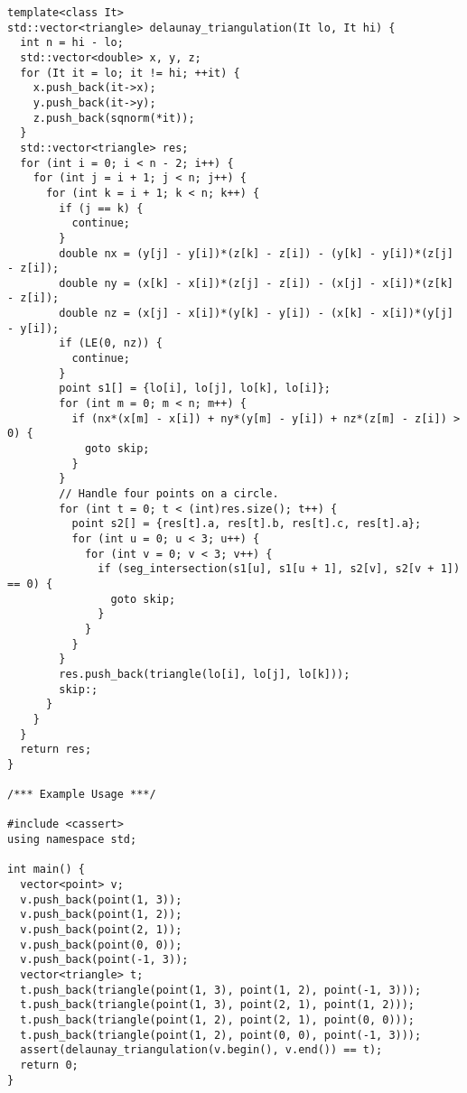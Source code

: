 \begin{lstlisting}
template<class It>
std::vector<triangle> delaunay_triangulation(It lo, It hi) {
  int n = hi - lo;
  std::vector<double> x, y, z;
  for (It it = lo; it != hi; ++it) {
    x.push_back(it->x);
    y.push_back(it->y);
    z.push_back(sqnorm(*it));
  }
  std::vector<triangle> res;
  for (int i = 0; i < n - 2; i++) {
    for (int j = i + 1; j < n; j++) {
      for (int k = i + 1; k < n; k++) {
        if (j == k) {
          continue;
        }
        double nx = (y[j] - y[i])*(z[k] - z[i]) - (y[k] - y[i])*(z[j] - z[i]);
        double ny = (x[k] - x[i])*(z[j] - z[i]) - (x[j] - x[i])*(z[k] - z[i]);
        double nz = (x[j] - x[i])*(y[k] - y[i]) - (x[k] - x[i])*(y[j] - y[i]);
        if (LE(0, nz)) {
          continue;
        }
        point s1[] = {lo[i], lo[j], lo[k], lo[i]};
        for (int m = 0; m < n; m++) {
          if (nx*(x[m] - x[i]) + ny*(y[m] - y[i]) + nz*(z[m] - z[i]) > 0) {
            goto skip;
          }
        }
        // Handle four points on a circle.
        for (int t = 0; t < (int)res.size(); t++) {
          point s2[] = {res[t].a, res[t].b, res[t].c, res[t].a};
          for (int u = 0; u < 3; u++) {
            for (int v = 0; v < 3; v++) {
              if (seg_intersection(s1[u], s1[u + 1], s2[v], s2[v + 1]) == 0) {
                goto skip;
              }
            }
          }
        }
        res.push_back(triangle(lo[i], lo[j], lo[k]));
        skip:;
      }
    }
  }
  return res;
}

/*** Example Usage ***/

#include <cassert>
using namespace std;

int main() {
  vector<point> v;
  v.push_back(point(1, 3));
  v.push_back(point(1, 2));
  v.push_back(point(2, 1));
  v.push_back(point(0, 0));
  v.push_back(point(-1, 3));
  vector<triangle> t;
  t.push_back(triangle(point(1, 3), point(1, 2), point(-1, 3)));
  t.push_back(triangle(point(1, 3), point(2, 1), point(1, 2)));
  t.push_back(triangle(point(1, 2), point(2, 1), point(0, 0)));
  t.push_back(triangle(point(1, 2), point(0, 0), point(-1, 3)));
  assert(delaunay_triangulation(v.begin(), v.end()) == t);
  return 0;
}
\end{lstlisting}
